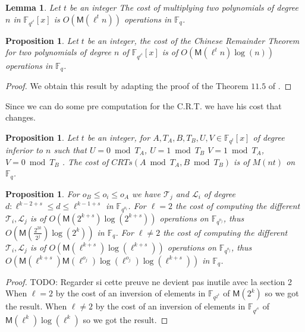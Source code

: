 \documentclass{lms}
\newcommand{\todo}[1]{{\color{red}TODO: #1}}
\newtheorem{lem}[thm]{Lemma}
\newtheorem{prop}[thm]{Proposition}
\begin{document}
\begin{lem}\label{lemma:complexity_pol_mul} Let $t$ be an integer
  The cost of multiplying two polynomials of degree $n$ in
  $\mathbb{F}_{q^{\ell^t}}[x] $ is $O(\mathsf{M}(\ell^tn))$ operations in
  $\mathbb{F}_q$.
\end{lem}

\begin{prop}Let $t$ be an integer,
the cost of the Chinese Remainder Theorem for two polynomials of
degree $n$ of $\mathbb{F}_{q^{\ell^t}}[x] $ is of
$O(\mathsf{M}(\ell^tn)\log(n))$ operations in $\mathbb{F}_q$.
\end{prop}

\begin{proof}
We obtain this result by adapting the proof of the Theorem $11.5$ of \cite{vzGG}.
\end{proof}

Since we can do some pre computation for the C.R.T. we have his cost that changes. 

\begin{prop}Let $t$ be an integer,
for $A, T_A,B, T_B,U,V \in \mathbb{F}_{q^{t}}[x]$ of degree inferior to $n$ such that $U=0 \bmod T_A$, $U=1 \bmod T_B$ $V=1 \bmod T_A$, $V=0 \bmod T_B$ . The cost of $CRTs(A \bmod T_A,B\bmod T_B)$ is of $M(nt)$ on $\mathbb{F}_q$.
\end{prop}

\begin{prop}
For $ o_{B} \leqslant o_i \leqslant o_{A}$ we have $\mathcal{T}_j$ and $\mathcal{L}_i$ of degree $d: \ell^{k-2+s}  \leqslant d \leqslant \ell^{k-1+s}$ in $\mathbb{F}_{q^{o_i}}$. 
\newline
For $\ell=2$ the cost of computing the different $\mathcal{T}_i,\mathcal{L}_j$ is of $O(\mathsf{M}(2^{k+s})\log(2^{k+s}))$ operations on $\mathbb{F}_{q^{o_j}}$, thus $O(\mathsf{M}(\frac{2^{2k}}{2^j})\log(2^{k}))$ in $\mathbb{F}_q$.
\newline 
For $\ell \neq 2$ the cost of computing the different $\mathcal{T}_i,\mathcal{L}_j$ is of $O(\mathsf{M}(\ell^{k+s})\log(\ell^{k+s}))$ operations on $\mathbb{F}_{q^{o_j}}$, thus $O(\mathsf{M}(\ell^{k+s})\mathsf{M}(\ell^{o_j}) \log(\ell^{o_j})\log(\ell^{k+s}))$ in $\mathbb{F}_q$. %
\end{prop}

\begin{proof}\todo{Regarder si cette preuve ne devient pas inutile avec la section 2}
When $\ell=2$ by \cite{DoSc12} the cost of an inversion of elements in $\mathbb{F}_{q^{2^k}}$ of $\mathsf{M}(2^k)$ so we got the result. When $\ell \neq 2$ by \cite{DeDoSc13} the cost of an inversion of elements in $\mathbb{F}_{q^{\ell^k}}$ of $\mathsf{M}(\ell^k)\log(\ell^k)$ so we got the result.
\end{proof}
\end{document}
